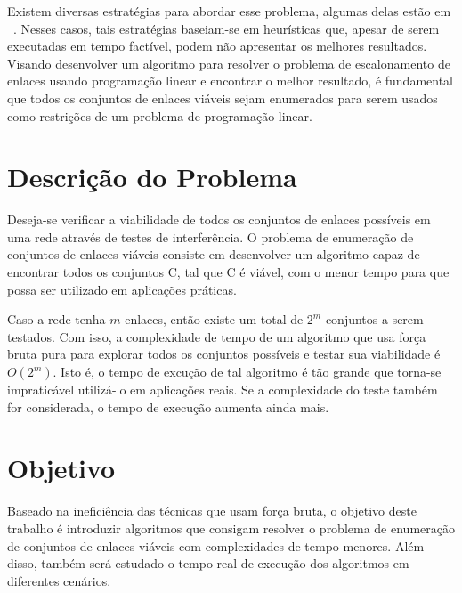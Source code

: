 Existem diversas estratégias para abordar esse problema, algumas delas estão em ~\cite{ciscoforecast, elevationdata}. Nesses casos, tais estratégias baseiam-se em heurísticas que, apesar de serem executadas em tempo factível, podem não apresentar os melhores resultados. Visando desenvolver um algoritmo para resolver o problema de escalonamento de enlaces usando programação linear e encontrar o melhor resultado, é fundamental que todos os conjuntos de enlaces viáveis sejam enumerados para serem usados como restrições de um problema de programação linear.

\section{Descrição do Problema}


Deseja-se verificar a viabilidade de todos os conjuntos de enlaces possíveis em uma rede através de testes de interferência.
O problema de enumeração de conjuntos de enlaces viáveis consiste em desenvolver um algoritmo capaz de encontrar todos os conjuntos C, tal que C é viável, com o menor tempo para que possa ser utilizado em aplicações práticas.

Caso a rede tenha $m$ enlaces, então existe um total de $2^m$ conjuntos a serem testados. Com isso, a complexidade de tempo de um algoritmo que usa força bruta pura para explorar todos os conjuntos possíveis e testar sua viabilidade é $O(2^m)$. Isto é, o tempo de excução de tal algoritmo é tão grande que torna-se impraticável utilizá-lo em aplicações reais. Se a complexidade do teste também for considerada, o tempo de execução aumenta ainda mais. 

\section{Objetivo}

Baseado na ineficiência das técnicas que usam força bruta, o objetivo deste trabalho é introduzir algoritmos que consigam resolver o problema de enumeração de conjuntos de enlaces viáveis com complexidades de tempo menores. Além disso, também será estudado o tempo real de execução dos algoritmos em diferentes cenários.
 
